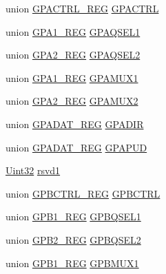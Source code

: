 \begin{DoxyCompactItemize}
\item 
union \hyperlink{union_g_p_a_c_t_r_l___r_e_g}{G\+P\+A\+C\+T\+R\+L\+\_\+\+R\+E\+G} \hyperlink{struct_g_p_i_o___c_t_r_l___r_e_g_s_ad99e4d5e7720e5c446fbe5b908774d99}{G\+P\+A\+C\+T\+R\+L}
\item 
union \hyperlink{union_g_p_a1___r_e_g}{G\+P\+A1\+\_\+\+R\+E\+G} \hyperlink{struct_g_p_i_o___c_t_r_l___r_e_g_s_a35efd78dbe398d76d1840a2207a9d695}{G\+P\+A\+Q\+S\+E\+L1}
\item 
union \hyperlink{union_g_p_a2___r_e_g}{G\+P\+A2\+\_\+\+R\+E\+G} \hyperlink{struct_g_p_i_o___c_t_r_l___r_e_g_s_aa8653fc3c9b06de3010610f6f07c2855}{G\+P\+A\+Q\+S\+E\+L2}
\item 
union \hyperlink{union_g_p_a1___r_e_g}{G\+P\+A1\+\_\+\+R\+E\+G} \hyperlink{struct_g_p_i_o___c_t_r_l___r_e_g_s_aa61a65b9fdc7cbb2fb155137171857b5}{G\+P\+A\+M\+U\+X1}
\item 
union \hyperlink{union_g_p_a2___r_e_g}{G\+P\+A2\+\_\+\+R\+E\+G} \hyperlink{struct_g_p_i_o___c_t_r_l___r_e_g_s_ad275b7e2f978ba4df141f52bd0f407f6}{G\+P\+A\+M\+U\+X2}
\item 
union \hyperlink{union_g_p_a_d_a_t___r_e_g}{G\+P\+A\+D\+A\+T\+\_\+\+R\+E\+G} \hyperlink{struct_g_p_i_o___c_t_r_l___r_e_g_s_a38950b2a5bf15f007c127ed833d8ed70}{G\+P\+A\+D\+I\+R}
\item 
union \hyperlink{union_g_p_a_d_a_t___r_e_g}{G\+P\+A\+D\+A\+T\+\_\+\+R\+E\+G} \hyperlink{struct_g_p_i_o___c_t_r_l___r_e_g_s_a18d16e95d398eaaf8076730793e8d57b}{G\+P\+A\+P\+U\+D}
\item 
\hyperlink{_d_s_p2833x___device_8h_aba99025e657f892beb7ff31cecf64653}{Uint32} \hyperlink{struct_g_p_i_o___c_t_r_l___r_e_g_s_a85066fcf35918e216ba6e16d18372ac8}{rsvd1}
\item 
union \hyperlink{union_g_p_b_c_t_r_l___r_e_g}{G\+P\+B\+C\+T\+R\+L\+\_\+\+R\+E\+G} \hyperlink{struct_g_p_i_o___c_t_r_l___r_e_g_s_ae3ed6dd1954f3f1913e4105a2d532d90}{G\+P\+B\+C\+T\+R\+L}
\item 
union \hyperlink{union_g_p_b1___r_e_g}{G\+P\+B1\+\_\+\+R\+E\+G} \hyperlink{struct_g_p_i_o___c_t_r_l___r_e_g_s_adbe3c0baefa6e8dd7cea974b40e8550a}{G\+P\+B\+Q\+S\+E\+L1}
\item 
union \hyperlink{union_g_p_b2___r_e_g}{G\+P\+B2\+\_\+\+R\+E\+G} \hyperlink{struct_g_p_i_o___c_t_r_l___r_e_g_s_a774d3a4cdc9a7b29930ed0320c45db21}{G\+P\+B\+Q\+S\+E\+L2}
\item 
union \hyperlink{union_g_p_b1___r_e_g}{G\+P\+B1\+\_\+\+R\+E\+G} \hyperlink{struct_g_p_i_o___c_t_r_l___r_e_g_s_ae944bcdeca2f5052da1b8c6ff66caa19}{G\+P\+B\+M\+U\+X1}

\end{DoxyCompactItemize}
